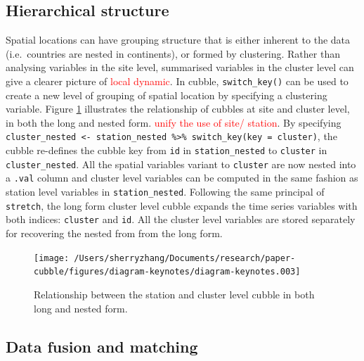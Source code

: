 \documentclass[
]{jss}
\begin{document}
\hypertarget{hierarchical-structure}{%
\subsection{Hierarchical structure}\label{hierarchical-structure}}

Spatial locations can have grouping structure that is either inherent to
the data (i.e.~countries are nested in continents), or formed by
clustering. Rather than analysing variables in the site level,
summarised variables in the cluster level can give a clearer picture of
\textcolor{red}{local dynamic}. In cubble, \texttt{switch\_key()} can be
used to create a new level of grouping of spatial location by specifying
a clustering variable. Figure \ref{fig:illu-hier} illustrates the
relationship of cubbles at site and cluster level, in both the long and
nested form. \textcolor{red}{unify the use of site/ station}. By
specifying
\texttt{cluster\_nested\ \textless{}-\ station\_nested\ \%\textgreater{}\%\ switch\_key(key\ =\ cluster)},
the cubble re-defines the cubble key from \texttt{id} in
\texttt{station\_nested} to \texttt{cluster} in
\texttt{cluster\_nested}. All the spatial variables variant to
\texttt{cluster} are now nested into a \texttt{.val} column and cluster
level variables can be computed in the same fashion as station level
variables in \texttt{station\_nested}. Following the same principal of
\texttt{stretch}, the long form cluster level cubble expands the time
series variables with both indices: \texttt{cluster} and \texttt{id}.
All the cluster level variables are stored separately for recovering the
nested from from the long form.

\begin{CodeChunk}
\begin{figure}

{\centering \texttt{[image: /Users/sherryzhang/Documents/research/paper-cubble/figures/diagram-keynotes/diagram-keynotes.003]} 

}

\caption[Relationship between the station and cluster level cubble in both long and nested form]{Relationship between the station and cluster level cubble in both long and nested form.}\label{fig:illu-hier}
\end{figure}
\end{CodeChunk}

\hypertarget{data-fusion-and-matching}{%
\subsection{Data fusion and matching}\label{data-fusion-and-matching}}
\end{document}

